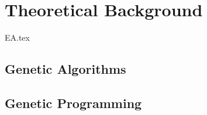 \chapter{Theoretical Background}
\label{chap:theoretical_background}
  {EA.tex}

  \section{Genetic Algorithms}
  \label{sec:genetic_algorithms}
    \Blindtext
  \section{Genetic Programming}
  \label{sec:genetic_programming}
    \Blindtext